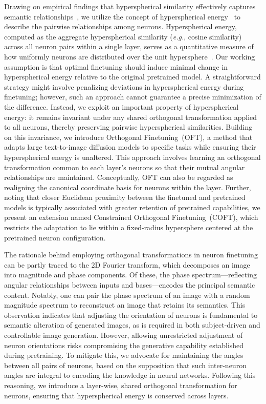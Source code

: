 Drawing on empirical findings that hyperspherical similarity effectively captures semantic relationships~\cite{liu2017deep,liu2018decoupled,chen2020angular}, we utilize the concept of hyperspherical energy~\cite{liu2018learning} to describe the pairwise relationships among neurons. Hyperspherical energy, computed as the aggregate hyperspherical similarity (\emph{e.g.}, cosine similarity) across all neuron pairs within a single layer, serves as a quantitative measure of how uniformly neurons are distributed over the unit hypersphere~\cite{liu2021learning}. Our working assumption is that optimal finetuning should induce minimal change in hyperspherical energy relative to the original pretrained model. A straightforward strategy might involve penalizing deviations in hyperspherical energy during finetuning; however, such an approach cannot guarantee a precise minimization of the difference. Instead, we exploit an important property of hyperspherical energy: it remains invariant under any shared orthogonal transformation applied to all neurons, thereby preserving pairwise hyperspherical similarities. Building on this invariance, we introduce Orthogonal Finetuning~(OFT), a method that adapts large text-to-image diffusion models to specific tasks while ensuring their hyperspherical energy is unaltered. This approach involves learning an orthogonal transformation common to each layer’s neurons so that their mutual angular relationships are maintained. Conceptually, OFT can also be regarded as realigning the canonical coordinate basis for neurons within the layer. Further, noting that closer Euclidean proximity between the finetuned and pretrained models is typically associated with greater retention of pretrained capabilities, we present an extension named Constrained Orthogonal Finetuning~(COFT), which restricts the adaptation to lie within a fixed-radius hypersphere centered at the pretrained neuron configuration.

The rationale behind employing orthogonal transformations in neuron finetuning can be partly traced to the 2D Fourier transform, which decomposes an image into magnitude and phase components. Of these, the phase spectrum—reflecting angular relationships between inputs and bases—encodes the principal semantic content. Notably, one can pair the phase spectrum of an image with a random magnitude spectrum to reconstruct an image that retains its semantics. This observation indicates that adjusting the orientation of neurons is fundamental to semantic alteration of generated images, as is required in both subject-driven and controllable image generation. However, allowing unrestricted adjustment of neuron orientations risks compromising the generative capability established during pretraining. To mitigate this, we advocate for maintaining the angles between all pairs of neurons, based on the supposition that such inter-neuron angles are integral to encoding the knowledge in neural networks. Following this reasoning, we introduce a layer-wise, shared orthogonal transformation for neurons, ensuring that hyperspherical energy is conserved across layers.

